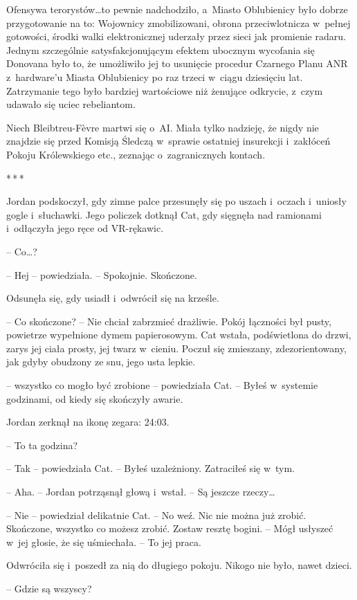 \documentclass[oneside,polish,11pt,sfheadings]{mwbk}
\newcommand{\threeast}{\bigskip\par\centerline{*\,*\,*}\medskip\par}%
\begin{document}
Ofensywa terorystów\ldots to pewnie nadchodziło, a~Miasto Oblubienicy było
dobrze przygotowanie na to: Wojownicy zmobilizowani, obrona
przeciwlotnicza w~pełnej gotowości, środki walki elektronicznej uderzały
przez sieci jak promienie radaru. Jednym szczególnie satysfakcjonującym
efektem ubocznym wycofania się Donovana było to, że umożliwiło jej to
usunięcie procedur Czarnego Planu ANR z~hardware'u Miasta Oblubienicy po
raz trzeci w~ciągu dziesięciu lat. Zatrzymanie tego było bardziej
wartościowe niż żenujące odkrycie, z~czym udawało się uciec rebeliantom.

Niech Bleibtreu-Fèvre martwi się o~AI. Miała tylko nadzieję, że nigdy
nie znajdzie się przed Komisją Śledczą w~sprawie ostatniej insurekcji i~zakłóceń Pokoju Królewskiego etc., zeznając o~zagranicznych kontach.
  \threeast 

Jordan podskoczył, gdy zimne palce przesunęły się po uszach i~oczach i~uniosły gogle i~słuchawki. Jego policzek dotknął Cat, gdy sięgnęła nad
ramionami i~odłączyła jego ręce od VR-rękawic.

-- Co\ldots ?

-- Hej -- powiedziała. -- Spokojnie. Skończone.

Odsunęła się, gdy usiadł i~odwrócił się na krześle.

-- Co skończone? -- Nie chciał zabrzmieć drażliwie. Pokój łączności był
pusty, powietrze wypełnione dymem papierosowym. Cat wstała, podświetlona
do drzwi, zarys jej ciała prosty, jej twarz w~cieniu. Poczuł się
zmieszany, zdezorientowany, jak gdyby obudzony ze snu, jego usta lepkie.

-- wszyst\-ko co mogło być zrobione -- powiedziała Cat. -- Byłeś w~systemie
godzinami, od kiedy się skończyły awarie.

Jordan zerknął na ikonę zegara: 24:03.

-- To ta godzina?

-- Tak -- powiedziała Cat. -- Byłeś uzależniony. Zatraciłeś się w~tym.

-- Aha. -- Jordan potrząsnął głową i~wstał. -- Są jeszcze rzeczy\ldots

-- Nie -- powiedział delikatnie Cat. -- No weź. Nic nie można już zrobić.
Skończone, wszyst\-ko co możesz zrobić. Zostaw resztę bogini. -- Mógł
usłyszeć w~jej głosie, że się uśmiechała. -- To jej praca.

Odwróciła się i~poszedł za nią do długiego pokoju. Nikogo nie było,
nawet dzieci.

-- Gdzie są wszyscy?
\end{document}
